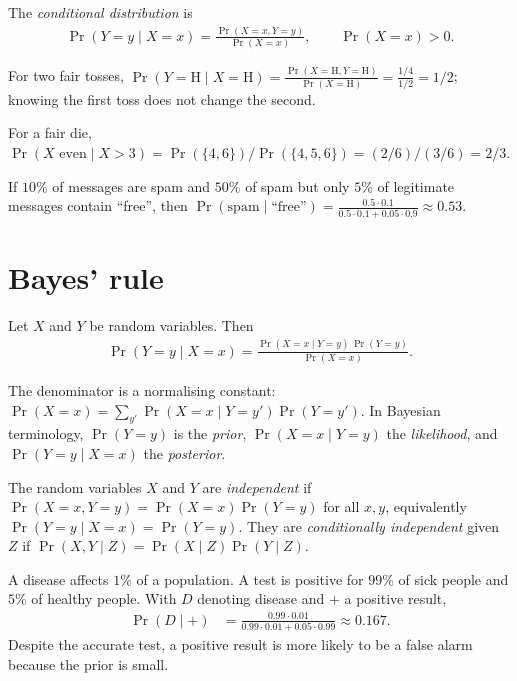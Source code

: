 \documentclass[a4paper, 12pt]{book}
\begin{document}
\begin{definition}
    The \emph{conditional distribution} is
    \begin{align}
        \Pr(Y = y \mid X = x) = \frac{\Pr(X = x, Y = y)}{\Pr(X = x)},
        \qquad \Pr(X=x) > 0.
    \end{align}
\end{definition}
\begin{example}
    For two fair tosses, $\Pr(Y=\mathrm{H}\mid X=\mathrm{H})=\frac{\Pr(X=\mathrm{H},Y=\mathrm{H})}{\Pr(X=\mathrm{H})}=\frac{1/4}{1/2}=1/2$; knowing the first toss does not change the second.
\end{example}

\begin{example}
    For a fair die, $\Pr(X\text{ even}\mid X>3)=\Pr(\{4,6\})/\Pr(\{4,5,6\})=(2/6)/(3/6)=2/3$.
\end{example}

\begin{example}
    If $10\%$ of messages are spam and $50\%$ of spam but only $5\%$ of legitimate messages contain ``free'', then $\Pr(\text{spam}\mid\text{``free''})=\frac{0.5\cdot0.1}{0.5\cdot0.1+0.05\cdot0.9}\approx0.53$.
\end{example}

\section{Bayes' rule}

\begin{proposition}
    Let $X$ and $Y$ be random variables. Then
    \begin{align}
    \Pr(Y = y \mid X = x)
    = \frac{\Pr(X = x \mid Y = y) \, \Pr(Y = y)}{\Pr(X = x)}.
\end{align}
\end{proposition}

The denominator is a normalising constant: $\Pr(X=x) = \sum_{y'} \Pr(X=x \mid Y=y')\Pr(Y=y')$. In Bayesian terminology, $\Pr(Y=y)$ is the \emph{prior}, $\Pr(X=x\mid Y=y)$ the \emph{likelihood}, and $\Pr(Y=y\mid X=x)$ the \emph{posterior}.

The random variables $X$ and $Y$ are \emph{independent} if $\Pr(X=x, Y=y) = \Pr(X=x)\Pr(Y=y)$ for all $x, y$, equivalently $\Pr(Y=y \mid X=x) = \Pr(Y=y)$. They are \emph{conditionally independent} given $Z$ if $\Pr(X,Y\mid Z) = \Pr(X\mid Z)\Pr(Y\mid Z)$.

\begin{example}
    A disease affects $1\%$ of a population. A test is positive for $99\%$ of sick people and $5\%$ of healthy people. With $D$ denoting disease and $+$ a positive result,
    \begin{align}
        \Pr(D\mid +)&=\frac{0.99\cdot0.01}{0.99\cdot0.01+0.05\cdot0.99}\approx0.167.
    \end{align}
    Despite the accurate test, a positive result is more likely to be a false alarm because the prior is small.
\end{example}
\end{document}
